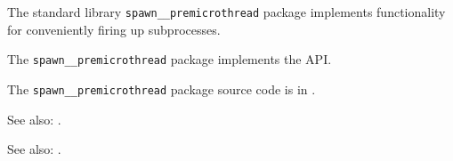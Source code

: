 
The standard library {\tt spawn\_\_premicrothread} package implements functionality for conveniently 
firing up subprocesses.

The {\tt spawn\_\_premicrothread} package implements the  API.

The {\tt spawn\_\_premicrothread} package source code is in .


See also:  .

See also:  .

